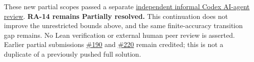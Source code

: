 \documentclass[11pt,a4paper]{article}
\begin{document}
These new partial scopes passed a separate
\href{https://github.com/ajt60gaibb/OpenProblemsInNLA/blob/main/references/holden-ra14-v6-2026-09-13/independent-review.md}{independent
informal Codex AI-agent review}. \textbf{RA-14 remains Partially
resolved.} This continuation does not improve the unrestricted bounds
above, and the same finite-accuracy transition gap remains. No Lean
verification or external human peer review is asserted. Earlier partial
submissions
\href{https://github.com/ajt60gaibb/OpenProblemsInNLA/pull/190}{\#190}
and
\href{https://github.com/ajt60gaibb/OpenProblemsInNLA/pull/220}{\#220}
remain credited; this is not a duplicate of a previously pushed full
solution.
\end{document}

